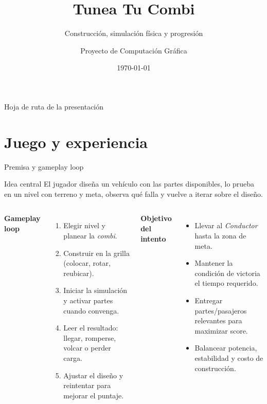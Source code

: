 \documentclass[aspectratio=169,11pt]{beamer}
\title[Tunea Tu Combi]{Tunea Tu Combi}
\subtitle{Construcción, simulación física y progresión}
\author{Proyecto de Computación Gráfica}
\institute{Universidad de Ingeniería y Tecnología (UTEC)}
\date{\today}
\begin{document}
\begin{frame}
  \titlepage
\end{frame}

\begin{frame}{Hoja de ruta de la presentación}
  \tableofcontents[hideallsubsections]
\end{frame}

\section{Juego y experiencia}

\begin{frame}{Premisa y gameplay loop}
  \begin{block}{Idea central}
    El jugador diseña un vehículo con las partes disponibles, lo prueba en un
    nivel con terreno y meta, observa qué falla y vuelve a iterar sobre el diseño.
  \end{block}

  \vspace{0.15cm}
  \begin{columns}[T]
    \textbf{Gameplay loop}
    \begin{enumerate}
      \item Elegir nivel y planear la \emph{combi}.
      \item Construir en la grilla (colocar, rotar, reubicar).
      \item Iniciar la simulación y activar partes cuando convenga.
      \item Leer el resultado: llegar, romperse, volcar o perder carga.
      \item Ajustar el diseño y reintentar para mejorar el puntaje.
    \end{enumerate}
    \textbf{Objetivo del intento}
    \begin{itemize}
      \item Llevar al \emph{Conductor} hasta la zona de meta.
      \item Mantener la condición de victoria el tiempo requerido.
      \item Entregar partes/pasajeros relevantes para maximizar score.
      \item Balancear potencia, estabilidad y costo de construcción.
    \end{itemize}
  \end{columns}
\end{frame}
\end{document}
